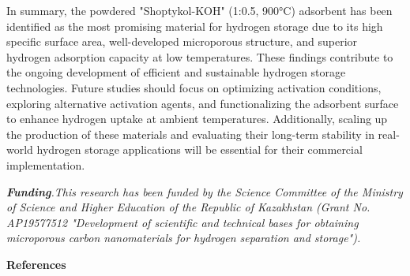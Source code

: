 \begin{multicols}{2}
In summary, the powdered "Shoptykol-KOH" (1:0.5, 900°C) adsorbent has
been identified as the most promising material for hydrogen storage due
to its high specific surface area, well-developed microporous structure,
and superior hydrogen adsorption capacity at low temperatures. These
findings contribute to the ongoing development of efficient and
sustainable hydrogen storage technologies. Future studies should focus
on optimizing activation conditions, exploring alternative activation
agents, and functionalizing the adsorbent surface to enhance hydrogen
uptake at ambient temperatures. Additionally, scaling up the production
of these materials and evaluating their long-term stability in
real-world hydrogen storage applications will be essential for their
commercial implementation.

\emph{{\bfseries Funding}.This research has been funded by the Science
Committee of the Ministry of Science and Higher Education of the
Republic of Kazakhstan (Grant No. AP19577512 "Development of scientific
and technical bases for obtaining microporous carbon nanomaterials for
hydrogen separation and storage").}
\end{multicols}

\begin{center}
{\bfseries References}
\end{center}


